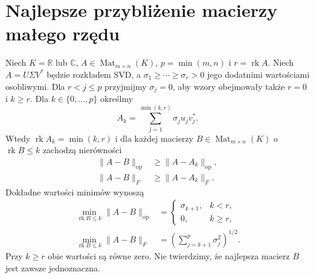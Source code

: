 \section{Najlepsze przybliżenie macierzy małego rzędu}
\label{sec:lin15-eckart-young}

\begin{twierdzenie}
\label{thm:lin15-eckart-young}
Niech \(K=\mathbb R\) lub \(\mathbb C\),
\(A\in\operatorname{Mat}_{m\times n}(K)\),
\(p=\min(m,n)\) i \(r=\operatorname{rk}A\).
Niech
\(A=U\Sigma V^*\)
będzie rozkładem SVD,
a \(\sigma_1\ge\cdots\ge\sigma_r>0\)
jego dodatnimi wartościami osobliwymi.
Dla \(r<j\le p\) przyjmijmy \(\sigma_j=0\),
aby wzory obejmowały także \(r=0\)
i \(k\ge r\).
Dla \(k\in\{0,\ldots,p\}\)
określmy
\[
 A_k=\sum_{j=1}^{\min(k,r)}
                   \sigma_j u_jv_j^*.
\]
Wtedy \(\operatorname{rk}A_k=\min(k,r)\)
i dla każdej macierzy
\(B\in\operatorname{Mat}_{m\times n}(K)\)
o \(\operatorname{rk}B\le k\)
zachodzą nierówności
\[
 \begin{aligned}
 \|A-B\|_{\mathrm{op}}
    &\ge\|A-A_k\|_{\mathrm{op}},\\
 \|A-B\|_F
    &\ge\|A-A_k\|_F.
 \end{aligned}
\]
Dokładne wartości minimów wynoszą
\[
 \begin{aligned}
 \min_{\operatorname{rk}B\le k}
               \|A-B\|_{\mathrm{op}}
 &=
 \begin{cases}
 \sigma_{k+1},&k<r,\\
 0,&k\ge r,
 \end{cases}\\
 \min_{\operatorname{rk}B\le k}
               \|A-B\|_F
 &=\left(\sum_{j=k+1}^{p}\sigma_j^2\right)^{1/2}.
 \end{aligned}
\]
Przy \(k\ge r\) obie wartości
są równe zero.
Nie twierdzimy, że najlepsza
macierz \(B\) jest zawsze jednoznaczna.
\end{twierdzenie}
